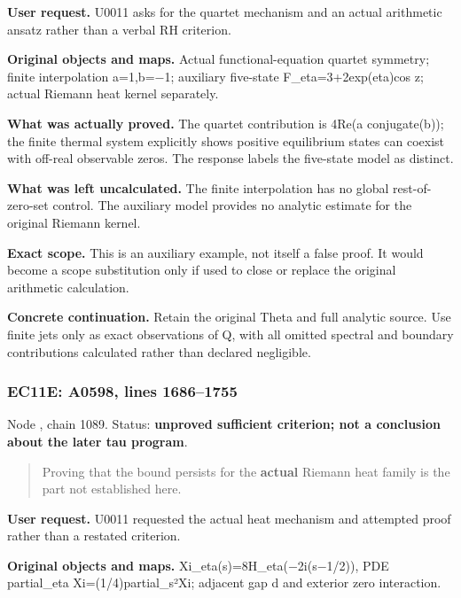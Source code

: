 \textbf{User request.} U0011 asks for the quartet mechanism and an
actual arithmetic ansatz rather than a verbal RH criterion.

\textbf{Original objects and maps.} Actual functional-equation quartet
symmetry; finite interpolation
a=1,b=\allowbreak{}\ensuremath{−}\allowbreak{}1; auxiliary five-state
F\_eta=3+2exp(eta)cos z; actual Riemann heat kernel separately.

\textbf{What was actually proved.} The quartet contribution is 4Re(a
conjugate(b)); the finite thermal system explicitly shows positive
equilibrium states can coexist with off-real observable zeros. The
response labels the five-state model as distinct.

\textbf{What was left uncalculated.} The finite interpolation has no
global rest-of-zero-set control. The auxiliary model provides no
analytic estimate for the original Riemann kernel.

\textbf{Exact scope.} This is an auxiliary example, not itself a false
proof. It would become a scope substitution only if used to close or
replace the original arithmetic calculation.

\textbf{Concrete continuation.} Retain the original Theta and full
analytic source. Use finite jets only as exact observations of Q, with
all omitted spectral and boundary contributions calculated rather than
declared negligible.

\subsubsection{EC11E: A0598, lines
1686--1755}\label{TranscriptLedgerStage:ec11e-a0598-lines-16861755}

Node \protect{}, chain 1089.
Status: \textbf{unproved sufficient criterion; not a conclusion about
the later tau program}.

\begin{quote}
Proving that the bound persists for the \textbf{actual} Riemann heat
family is the part not established here.
\end{quote}

\textbf{User request.} U0011 requested the actual heat mechanism and
attempted proof rather than a restated criterion.

\textbf{Original objects and maps.}
Xi\_eta(s)=8H\_eta(\allowbreak{}\ensuremath{−}\allowbreak{}2i(s\allowbreak{}\ensuremath{−}\allowbreak{}1/2)),
PDE partial\_eta Xi=(1/4)partial\_s²Xi; adjacent gap d and exterior zero
interaction.

